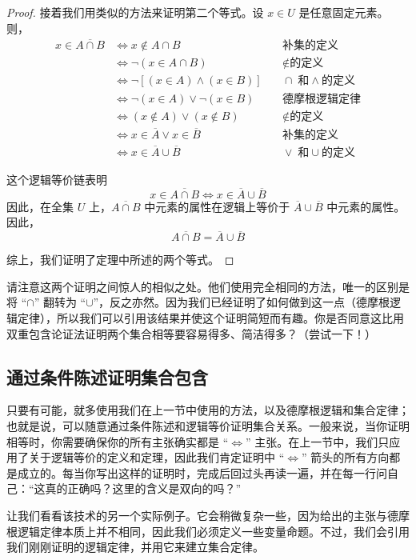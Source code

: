 \begin{proof}
    接着我们用类似的方法来证明第二个等式。设 $x \in U$ 是任意固定元素。则，
    \begin{align*}
        x \in \overline{A \cap B} &\iff x \notin A \cap B &\quad \text{补集的定义}\\
        &\iff \neg(x \in A \cap B) &\quad \notin \text{的定义}\\
        &\iff \neg[(x \in A) \land (x \in B)] &\quad \cap \;\text{和} \land \text{的定义}\\
        &\iff \neg(x \in A) \lor \neg(x \in B) &\quad \text{德摩根逻辑定律}\\
        &\iff (x \notin A) \lor (x \notin B) &\quad \notin \text{的定义}\\
        &\iff x \in \overline{A} \lor x \in \overline{B} &\quad \text{补集的定义}\\
        &\iff x \in \overline{A} \cup \overline{B} &\quad \lor \;\text{和} \cup \text{的定义}
    \end{align*}

    这个逻辑等价链表明
    \[x \in \overline{A \cap B} \iff x \in \overline{A} \cup \overline{B}\]
    因此，在全集 $U$ 上，$\overline{A \cap B}$ 中元素的属性在逻辑上等价于 $\overline{A} \cup \overline{B}$ 中元素的属性。因此，
    \[\overline{A \cap B} = \overline{A} \cup \overline{B}\]

    综上，我们证明了定理中所述的两个等式。
\end{proof}

请注意这两个证明之间惊人的相似之处。他们使用完全相同的方法，唯一的区别是将 ``$\cap$'' 翻转为 ``$\cup$''，反之亦然。因为我们已经证明了如何做到这一点（德摩根逻辑定律），所以我们可以引用该结果并使这个证明简短而有趣。你是否同意这比用双重包含论证法证明两个集合相等要容易得多、简洁得多？（尝试一下！）

\subsection{通过条件陈述证明集合包含}

只要有可能，就多使用我们在上一节中使用的方法，以及德摩根逻辑和集合定律；也就是说，可以随意通过条件陈述和逻辑等价证明集合关系。一般来说，当你证明相等时，你需要确保你的所有主张确实都是 ``$\iff$'' 主张。在上一节中，我们只应用了关于逻辑等价的定义和定理，因此我们肯定证明中 ``$\iff$'' 箭头的所有方向都是成立的。每当你写出这样的证明时，完成后回过头再读一遍，并在每一行问自己：``这真的正确吗？这里的含义是双向的吗？''

让我们看看该技术的另一个实际例子。它会稍微复杂一些，因为给出的主张与德摩根逻辑定律本质上并不相同，因此我们必须定义一些变量命题。不过，我们会引用我们刚刚证明的逻辑定律，并用它来建立集合定律。

